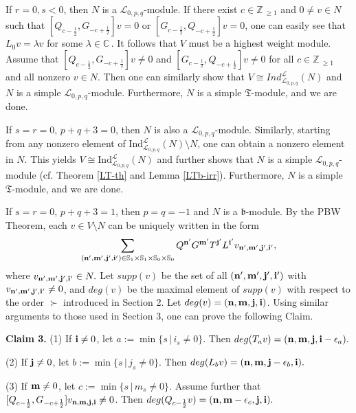 \documentclass[12pt]{article}
\def\l{\lambda}
\def\ssc{\scriptscriptstyle}
\def\Z{\mathbb{Z}{\ssc\,}}
\def\C{\mathbb{C}{\ssc\,}}
\numberwithin{equation}{section}
\begin{document}
If $r=0, s<0$, then $N$ is a $\mathcal{L}_{0,p,q}$-module. If  there exist $c\in\Z_{\ge 1}$  and $0\ne v\in N$ such that $[Q_{c-\frac{1}{2}},G_{-c+\frac{1}{2}}]v=0$ or $[G_{c-\frac{1}{2}},Q_{-c+\frac{1}{2}}]v=0$, one can easily see that $L_0v=\l v$ for some $\l\in\C$. It follows that  $V$ must be a highest weight module.  Assume that
$[Q_{c-\frac{1}{2}},G_{-c+\frac{1}{2}}]v\ne 0$ and $[G_{c-\frac{1}{2}},Q_{-c+\frac{1}{2}}]v\ne 0 $ for all $c\in\Z_{\ge 1}$ and all nonzero $v\in N$.
Then one can similarly show that  $V\cong Ind^{\mathcal{L}}_{\mathcal{L}_{0,p,q}}(N)$ and  $N$ is a simple $\mathcal{L}_{0,p,q}$-module. Furthermore, $N$ is a simple $\mathfrak{T}$-module, and we are done.

If $s=r=0,\, p+q+3=0$,   then $N$ is also a $\mathcal{L}_{0,p,q}$-module. Similarly, starting from any nonzero element of $\mathrm{Ind}^{\mathcal{L}}_{\mathcal{L}_{0,p,q}}(N)\setminus N$,
one can obtain a nonzero element in $N$. This yields $V\cong \mathrm{Ind}^{\mathcal{L}}_{\mathcal{L}_{0,p,q}}(N)$ and further shows that $N$ is a simple $\mathcal{L}_{0,p,q}$-module
(cf. Theorem \ref{LT-th} and Lemma \ref{LTb-irr}). Furthermore, $N$ is a  simple $\mathfrak{T}$-module, and we are done.





If $s=r=0,\, p+q+3=1$, then $p=q=-1$ and $N$ is a $\mathfrak{b}$-module.
By the PBW Theorem, each $v\in V\setminus N$ can be uniquely written in  the form
\begin{equation}
\sum\limits_{({\bf n',m',j',i'})\in \mathbb{S}_1\times \mathbb{S}_1\times \mathbb{S}_0\times \mathbb{S}_0}Q^{\bf n'}G^{\bf m'}T^{\bf j'}L^{\bf i'}v_{\bf n',m',j',i'},
\end{equation}
 where $v_{{\bf n',m',j',i'}}\in N.$ Let $supp(v)$ be the set of all $({\bf n',m',j',i'})$ with $v_{{\bf n',m',j',i'}}\ne 0$, and $deg(v)$ be the maximal element of $supp(v)$ with respect to the  order $\succ$ introduced in Section 2.  Let $deg(v)=({\bf n,m,j,i})$.
 Using similar arguments to those used in Section 3, one can prove  the following Claim.

{\bf Claim 3.}
(1) If ${\bf i}\ne 0$, let $a:=\min\{s\,|\,i_s\ne 0\}.$ Then $deg(T_{a}v)=({\bf n,m,j,i}-\epsilon_a).$

(2) If $ {\bf j}\ne 0$, let $b:=\min\{s\,|\,j_s\ne 0\}.$ Then  $deg(L_{b}v)=({\bf n,m,j}-\epsilon_b,{\bf i}).$

(3) If ${\bf m}\ne 0$, let $c:=\min\{s\,|\,m_s\ne 0\}.$  Assume further that $[Q_{c-\frac{1}{2}}, G_{-c+\frac{1}{2}}]v_{{\bf n,m,j,i}}\ne 0$. Then $deg(Q_{c-\frac{1}{2}}v)=({\bf n,m}-\epsilon_c,{\bf j,i}).$
\end{document}
